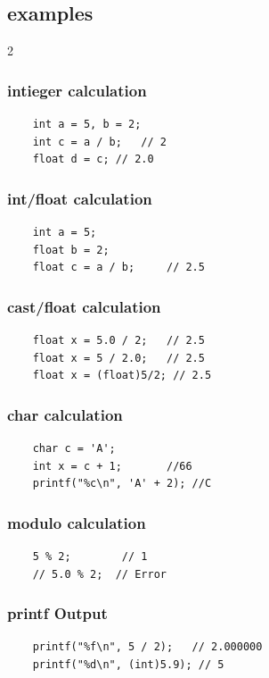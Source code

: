 \documentclass[a4paper,9pt]{article}
\begin{document}
    \subsection{examples}
    \begin{multicols}{2}
        \subsubsection{intieger calculation}
        \begin{lstlisting}
    int a = 5, b = 2;
    int c = a / b;   // 2
    float d = c; // 2.0
        \end{lstlisting}
        \subsubsection{int/float calculation}
        \begin{lstlisting}
    int a = 5;
    float b = 2;
    float c = a / b;     // 2.5
        \end{lstlisting}
        \subsubsection{cast/float calculation}
        \begin{lstlisting}
    float x = 5.0 / 2;   // 2.5
    float x = 5 / 2.0;   // 2.5
    float x = (float)5/2; // 2.5
        \end{lstlisting}
        \subsubsection{char calculation}
        \begin{lstlisting}
    char c = 'A';
    int x = c + 1;       //66
    printf("%c\n", 'A' + 2); //C
        \end{lstlisting}
        \subsubsection{modulo calculation}
        \begin{lstlisting}
    5 % 2;        // 1
    // 5.0 % 2;  // Error
        \end{lstlisting}
        \subsubsection{printf Output}
        \begin{lstlisting}
    printf("%f\n", 5 / 2);   // 2.000000
    printf("%d\n", (int)5.9); // 5
        \end{lstlisting}
    \end{multicols}
    
\end{document}
